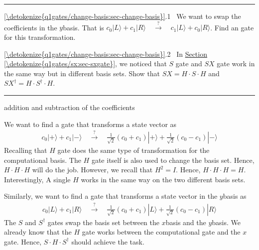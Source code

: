 \documentclass[letterpaper,10pt,english]{jupyterBook}
\begin{document}
\bigskip\hrule\bigskip


\sphinxAtStartPar
{} \hyperref[\detokenize{q1gates/change-basis:sec-change-basis}]{\ref{\detokenize{q1gates/change-basis:sec-change-basis}}}.1   We want to swap the coefficients in the \(y\)\sphinxhyphen{}basis.  That is \(
c_0 |L\rangle + c_1 |R\rangle \quad \xrightarrow{?} \quad c_1 |L\rangle + c_0 |R\rangle \). Find an gate for this transformation.

\sphinxAtStartPar
{} \hyperref[\detokenize{q1gates/change-basis:sec-change-basis}]{\ref{\detokenize{q1gates/change-basis:sec-change-basis}}}.2   In \hyperref[\detokenize{q1gates/sx:sec-sxgate}]{Section \ref{\detokenize{q1gates/sx:sec-sxgate}}}, we noticed that \(S\) gate and \(SX\) gate work in the same way but in different basis sets.  Show that \(SX = H \cdot S \cdot H\) and \(SX^\dagger = H \cdot S^\dagger \cdot H\).


\bigskip\hrule\bigskip


\sphinxAtStartPar
{} addition and subtraction of the coefficients

\sphinxAtStartPar
We want to find a gate that transforms a state vector as
\begin{equation*}
\begin{split}
c_0 |+\rangle + c_1|-\rangle \quad \xrightarrow{?} \quad \frac{1}{\sqrt{2}}\left(c_0+c_1\right)|+\rangle + \frac{1}{\sqrt{2}}\left(c_0-c_1\right)|-\rangle
\end{split}
\end{equation*}
\sphinxAtStartPar
Recalling that \(H\) gate does the same type of transformation for the computational basis.  The \(H\) gate itself is also used to change the basis set. Hence, \(H \cdot H \cdot H\) will do the job. However, we recall that \(H^2=I\).  Hence, \(H \cdot H \cdot H=H\).  Interestingly, A single \(H\) works in the same way on the two different basis sets.

\sphinxAtStartPar
Similarly, we want to find a gate that transforms a state vector in the \(y\)\sphinxhyphen{}basis as
\begin{equation*}
\begin{split}
c_0 |L\rangle + c_1|R\rangle \quad \xrightarrow{?} \quad \frac{1}{\sqrt{2}}\left(c_0+c_1\right)|L\rangle + \frac{1}{\sqrt{2}}\left(c_0-c_1\right)|R\rangle
\end{split}
\end{equation*}
\sphinxAtStartPar
The \(S\) and \(S^\dagger\) gates swap the basis set between the \(x\)\sphinxhyphen{}basis and the \(y\)\sphinxhyphen{}basis. We already know that the \(H\) gate works between the computational gate and the \(x\) gate.  Hence, \(S \cdot H \cdot S^\dagger\) should achieve the task.
\end{document}
